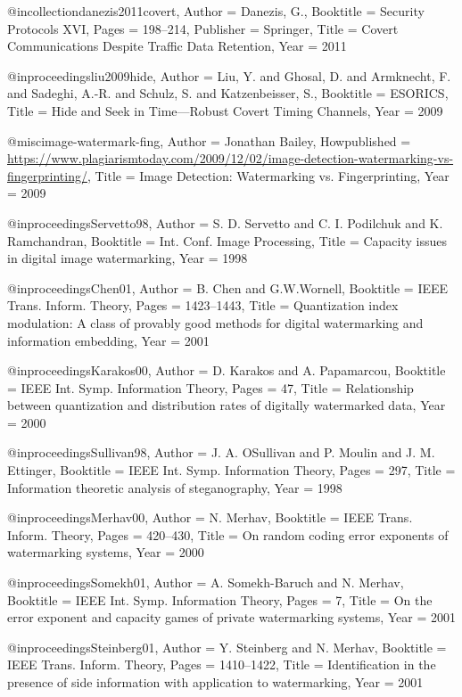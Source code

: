{{{{{{{	@incollection{danezis2011covert,
	Author = {Danezis, G.},
	Booktitle = {Security Protocols XVI},
	Pages = {198--214},
	Publisher = {Springer},
	Title = {{Covert Communications Despite Traffic Data Retention}},
	Year = {2011}}
	
	@inproceedings{liu2009hide,
	Author = {Liu, Y. and Ghosal, D. and Armknecht, F. and Sadeghi, A.-R. and Schulz, S. and Katzenbeisser, S.},
	Booktitle = {ESORICS},
	Title = {{Hide and Seek in Time---Robust Covert Timing Channels}},
	Year = {2009}}
	
	@misc{image-watermark-fing,
	Author = {Jonathan Bailey},
	Howpublished = {\url{https://www.plagiarismtoday.com/2009/12/02/image-detection-watermarking-vs-fingerprinting/}},
	Title = {{Image Detection: Watermarking vs. Fingerprinting}},
	Year = {2009}}
	
	@inproceedings{Servetto98,
	Author = {S. D. Servetto and C. I. Podilchuk and K. Ramchandran},
	Booktitle = {Int. Conf. Image Processing},
	Title = {Capacity issues in digital image watermarking},
	Year = {1998}}
	
	@inproceedings{Chen01,
	Author = {B. Chen and G.W.Wornell},
	Booktitle = {IEEE Trans. Inform. Theory},
	Pages = {1423--1443},
	Title = {Quantization index modulation: A class of provably good methods for digital watermarking and information embedding},
	Year = {2001}}
	
	@inproceedings{Karakos00,
	Author = {D. Karakos and A. Papamarcou},
	Booktitle = {IEEE Int. Symp. Information Theory},
	Pages = {47},
	Title = {Relationship between quantization and distribution rates of digitally watermarked data},
	Year = {2000}}
	
	@inproceedings{Sullivan98,
	Author = {J. A. OSullivan and P. Moulin and J. M. Ettinger},
	Booktitle = {IEEE Int. Symp. Information Theory},
	Pages = {297},
	Title = {Information theoretic analysis of steganography},
	Year = {1998}}
	
	@inproceedings{Merhav00,
	Author = {N. Merhav},
	Booktitle = {IEEE Trans. Inform. Theory},
	Pages = {420--430},
	Title = {On random coding error exponents of watermarking systems},
	Year = {2000}}
	
	@inproceedings{Somekh01,
	Author = {A. Somekh-Baruch and N. Merhav},
	Booktitle = {IEEE Int. Symp. Information Theory},
	Pages = {7},
	Title = {On the error exponent and capacity games of private watermarking systems},
	Year = {2001}}
	
	@inproceedings{Steinberg01,
	Author = {Y. Steinberg and N. Merhav},
	Booktitle = {IEEE Trans. Inform. Theory},
	Pages = {1410--1422},
	Title = {Identification in the presence of side information with application to watermarking},
	Year = {2001}}
	
}}}}}}}
